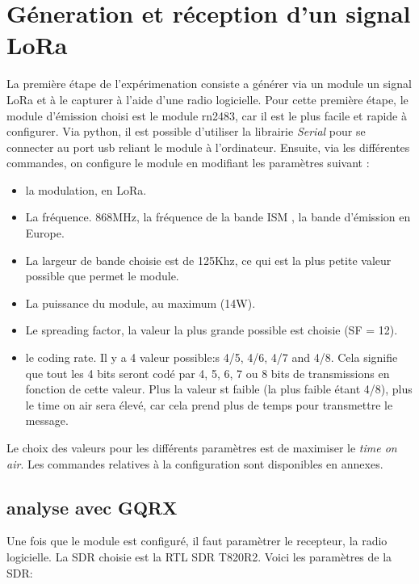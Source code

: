 \section{Géneration et réception d'un signal LoRa} \label{signallora}

La première étape de l'expérimenation consiste a générer via un module un signal LoRa et à le capturer à l'aide d'une radio logicielle. Pour cette première étape, le module d'émission choisi est le module rn2483, car il est le plus facile et rapide à configurer.
Via python, il est possible d'utiliser la librairie \textit{Serial} pour se connecter au port usb reliant le module à l'ordinateur. Ensuite, via les différentes commandes, on configure le module en modifiant les paramètres suivant : 

\begin{itemize}
\item la modulation, en LoRa.
\item La fréquence. 868MHz, la fréquence de la bande ISM , la bande d'émission en Europe.
\item La largeur de bande choisie est de 125Khz, ce qui est la plus petite valeur possible que permet le module.
\item La puissance du module, au maximum (14W).
\item Le spreading factor, la valeur la plus grande possible est choisie (SF = 12).
\item le coding rate. Il y a 4 valeur possible:s 4/5, 4/6, 4/7 and 4/8. Cela signifie que tout les 4 bits seront codé par 4, 5, 6, 7 ou 8 bits de transmissions en fonction de cette valeur. Plus la valeur st faible (la plus faible étant 4/8), plus le time on air sera élevé, car cela prend plus de temps pour transmettre le message.
\end{itemize}

Le choix des valeurs pour les différents paramètres est de maximiser le \textit{time on air}. Les commandes relatives à la configuration sont disponibles en annexes.

\subsection{analyse avec GQRX}

Une fois que le module est configuré, il faut paramètrer le recepteur, la radio logicielle. La SDR choisie est la RTL SDR T820R2. Voici les paramètres de la SDR:

